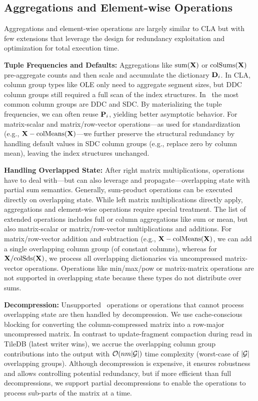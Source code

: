 \subsection{Aggregations and Element-wise Operations}

Aggregations and element-wise operations are largely similar to CLA but with few extensions that leverage the design for redundancy exploitation and optimization for total execution time.

\textbf{Tuple Frequencies and Defaults:} Aggregations like $\text{sum}(\mathbf{X})$ or $\text{colSums}(\mathbf{X})$ pre-aggregate counts and then scale and accumulate the dictionary $\mathbf{D}_i$. In CLA, column group types like OLE only need to aggregate segment sizes, but DDC column groups still required a full scan of the index structures. In \name\, the most common column groups are DDC and SDC. By materializing the tuple frequencies, we can often reuse $\mathbf{P}_i$, yielding better asymptotic behavior. For matrix-scalar and matrix/row-vector operations---as used for standardization (e.g., $\mathbf{X}-\text{colMeans}(\mathbf{X})$---we further preserve the structural redundancy by handling default values in SDC column groups (e.g., replace zero by column mean), leaving the index structures unchanged.

\textbf{Handling Overlapped State:}
After right matrix multiplications, operations have to deal with---but can also leverage and propagate---overlapping state with partial sum semantics.
Generally, sum-product operations can be executed directly on overlapping state.
While left matrix multiplications directly apply, aggregations and element-wise operations require special treatment.
The list of extended operations includes full or column aggregations like sum or mean, but also matrix-scalar or matrix/row-vector multiplications and additions.
For matrix/row-vector addition and subtraction (e.g., $\mathbf{X}-\text{colMeans}(\mathbf{X})$, we can add a single overlapping column group (of constant columns),
whereas for $\mathbf{X}/\text{colSds}(\mathbf{X})$, we process all overlapping dictionaries via uncompressed matrix-vector operations.
Operations like min/max/pow or matrix-matrix operations are not supported in overlapping state because these types do not distribute over sums.

\textbf{Decompression:}
Unsupported \name\ operations or operations that cannot process overlapping state are then handled by decompression.
We use cache-conscious blocking for converting the column-compressed matrix into a row-major uncompressed matrix.
In contrast to update-fragment compaction during read in TileDB \cite{PapadopoulosDMM16} (latest writer wins),
we accrue the overlapping column group contributions into the output with $\mathcal{O}(nm\lvert \mathcal{G}\rvert)$ time complexity (worst-case of $\lvert \mathcal{G}\rvert$ overlapping groups). Although decompression is expensive, it ensures robustness and allows controlling potential redundancy,
but if more efficient than full decompressions, we support partial decompressions to enable the operations to process sub-parts of the matrix at a time. 
